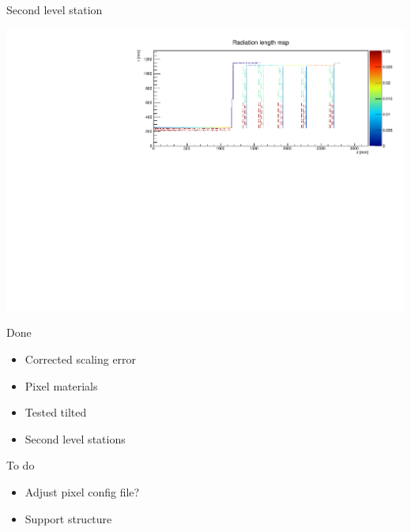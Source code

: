 \documentclass[pdftex, 11pt]{beamer}
\begin{document}
\begin{frame}{Second level station}
  \begin{center}
    \includegraphics[width=\textwidth]{img/stazione2.pdf}
  \end{center}
\end{frame}

\begin{frame}
  \begin{block}{Done}
    \begin{itemize}
    \item Corrected scaling error
    \item Pixel materials
    \item Tested tilted
    \item Second level stations
    \end{itemize}
  \end{block}
  \begin{block}{To do}
    \begin{itemize}
    \item Adjust pixel config file?
    \item Support structure
    \end{itemize}
  \end{block}
\end{frame}
\end{document}
